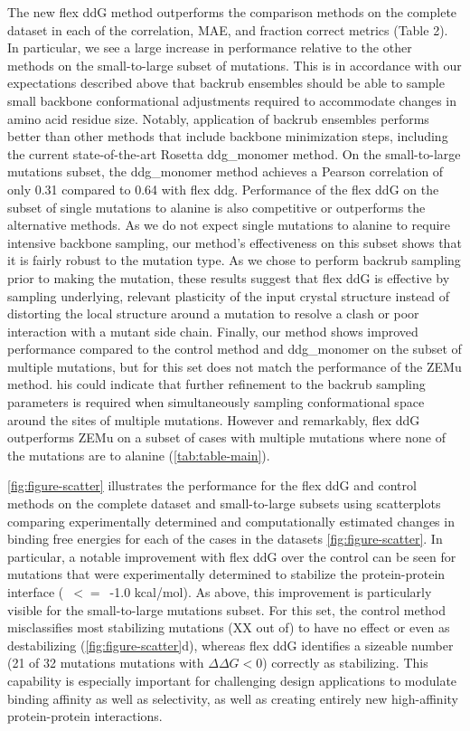 The new flex ddG method outperforms the comparison methods on the complete dataset in each of the correlation, MAE, and fraction correct metrics (Table 2). In particular, we see a large increase in performance relative to the other methods on the small-to-large subset of mutations. This is in accordance with our expectations described above that backrub ensembles should be able to sample small backbone conformational adjustments required to accommodate changes in amino acid residue size. Notably, application of backrub ensembles performs better than other methods that include backbone minimization steps, including the current state-of-the-art Rosetta ddg\_monomer method. On the small-to-large mutations subset, the ddg\_monomer method achieves a Pearson correlation of only 0.31 compared to 0.64 with flex ddg.
Performance of the flex ddG on the subset of single mutations to alanine is also competitive or outperforms the alternative methods.
As we do not expect single mutations to alanine to require intensive backbone sampling, our method's effectiveness on this subset shows that it is fairly robust to the mutation type.
As we chose to perform backrub sampling prior to making the mutation, these results suggest that flex ddG is effective by sampling underlying, relevant plasticity of the input crystal structure instead of distorting the local structure around a mutation to resolve a clash or poor interaction with a mutant side chain.
Finally, our method shows improved performance compared to the control method and ddg\_monomer on the subset of multiple mutations, but for this set does not match the performance of the ZEMu method.
his could indicate that further refinement to the backrub sampling parameters is required when simultaneously sampling conformational space around the sites of multiple mutations.
However and remarkably, flex ddG outperforms ZEMu on a subset of cases with multiple mutations where none of the mutations are to alanine (\cref{tab:table-main}).

\cref{fig:figure-scatter} illustrates the performance for the flex ddG and control methods on the complete dataset and small-to-large subsets using scatterplots comparing experimentally determined and computationally estimated changes in binding free energies for each of the cases in the datasets \cref{fig:figure-scatter}. In particular, a notable improvement with flex ddG over the control can be seen for mutations that were experimentally determined to stabilize the protein-protein interface (\ddg\ $<=$\ -1.0 kcal/mol). As above, this improvement is particularly visible for the small-to-large mutations subset. For this set, the control method misclassifies most stabilizing mutations (XX out of) to have no effect or even as destabilizing (\cref{fig:figure-scatter}d), whereas flex ddG identifies a sizeable number (21 of 32 mutations mutations with $\Delta\Delta G < 0$) correctly as stabilizing. This capability is especially important for challenging design applications to modulate binding affinity as well as selectivity, as well as creating entirely new high-affinity protein-protein interactions.

